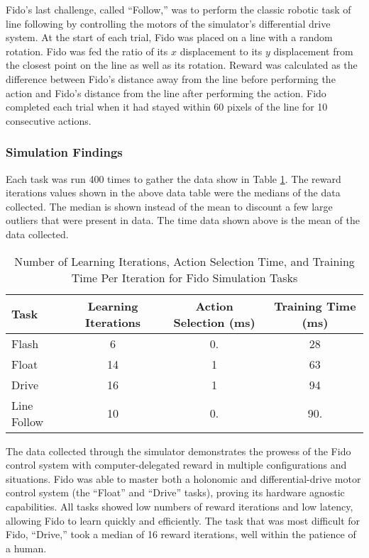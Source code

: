 Fido's last challenge, called ``Follow,'' was to perform the classic robotic task of line following by controlling the motors of the simulator's differential drive system.
At the start of each trial, Fido was placed on  a line with a random rotation.
Fido was fed the ratio of its $x$ displacement to its $y$ displacement from the closest point on the line as well as its rotation.
Reward was calculated as the difference between Fido's distance away from the line before performing the action and Fido's distance from the line after performing the action.
Fido completed each trial when it had stayed within 60 pixels of the line for 10 consecutive actions.

\subsubsection{Simulation Findings}

Each task was run 400 times to gather the data show in Table \ref{tab:data}.
The reward iterations values shown in the above data table were the medians of the data collected.
The median is shown instead of the mean to discount a few large outliers that were present in data.
The time data shown above is the mean of the data collected.

\begin{table}[ht]
	\centering
	\begin{tabular}{@{}lccc@{}}
		\toprule
		Task        & Learning Iterations & Action Selection (ms) & Training Time (ms) \\ \midrule
		Flash       & 6                   & 0.                 & 28                    \\
		Float       & 14                  & 1                  & 63                    \\
		Drive       & 16                  & 1                  & 94                    \\
		Line Follow & 10                  & 0.                 & 90.				   \\ \bottomrule
	\end{tabular}
	\caption{Number of Learning Iterations, Action Selection Time, and Training Time Per Iteration for Fido Simulation Tasks}
	\label{tab:data}
\end{table}

The data collected through the simulator demonstrates the prowess of the Fido control system with computer-delegated reward in multiple configurations and situations.
Fido was able to master both a holonomic and differential-drive motor control system (the ``Float'' and ``Drive'' tasks), proving its hardware agnostic capabilities.
All tasks showed low numbers of reward iterations and low latency, allowing Fido to learn quickly and efficiently.
The task that was most difficult for Fido, ``Drive,'' took a median of 16 reward iterations, well within the patience of a human.

